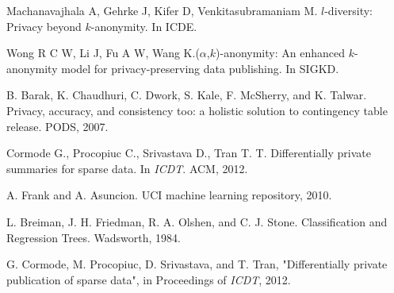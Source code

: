 \begin{thebibliography}{1}
 Machanavajhala A, Gehrke J, Kifer D, Venkitasubramaniam M. $l$-diversity: Privacy beyond $k$-anonymity. In ICDE.


 Wong R C W, Li J, Fu A W, Wang K.($\alpha$,$k$)-anonymity: An enhanced $k$-anonymity model for privacy-preserving data publishing. In SIGKD.





B. Barak, K. Chaudhuri, C. Dwork, S. Kale, F. McSherry, and K. Talwar. Privacy, accuracy, and consistency too: a holistic solution to contingency table release. PODS, 2007.





Cormode G., Procopiuc C., Srivastava D., Tran T. T. Differentially private summaries for sparse data. In {\it ICDT}. ACM, 2012.






A. Frank and A. Asuncion. UCI machine learning repository, 2010.



 L. Breiman, J. H. Friedman, R. A. Olshen, and C. J. Stone. Classification and Regression Trees. Wadsworth, 1984.

G. Cormode, M. Procopiuc, D. Srivastava, and T. Tran, "Differentially
private publication of sparse data", in Proceedings of {\it ICDT}, 2012.

\end{thebibliography}